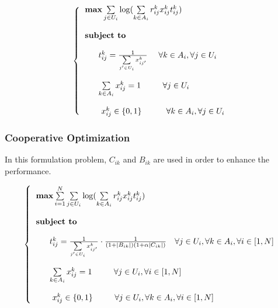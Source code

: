 \documentclass[journal,transmag]{IEEEtran}
\begin{document}
\begin{footnotesize}
\begin{equation}
\left\{
\begin{tabular}{l} 
$\textbf{max} \sum\limits_{j \in U_i} \log (\sum\limits_{k \in A_i} r_{ij}^k  x_{ij}^k  t_{ij}^k) $ \\         
\\
\textbf{subject to} \\

\\
~~~~~$t_{ij}^k = \frac{1}{\sum\limits_{j' \in U_i} x_{ij'}^k} ~~~~ \forall k \in A_i, \forall j \in U_i $  \\

\\
~~~~~$ \sum\limits_{k \in A_i} x_{ij}^k = 1 $ ~~~~~~ $\forall j \in U_i $  \\

\\
~~~~~ $x_{ij}^k \in \{0,1\} ~~~~~~~~~ \forall k \in A_i, \forall j \in U_i $ \\

\end{tabular}
\right.
\end{equation}
\end{footnotesize}


\subsubsection{Cooperative Optimization}
In this formulation problem, $C_{ik}$ and $B_{ik}$ are used in order to enhance the performance. 
\begin{footnotesize}
\begin{equation}
\left\{
\begin{tabular}{l} 
$\textbf{max}  \sum\limits_{i=1}^N \sum\limits_{j \in U_i}  \log ( \sum\limits_{k \in A_i} r_{ij}^k  x_{ij}^k t_{ij}^k) $ \\         
\\
\textbf{subject to} \\

\\
~~~~~$ t_{ij}^k = \frac{1}{\sum\limits_{j' \in U_i} x_{ij'}^k} \cdot \frac{1}{(1+|B_{ik}|)(1+\alpha |C_{ik}|)}     $ ~ $\forall j \in U_i, \forall k \in A_i, \forall i \in [1, N] $  \\ 

\\
~~~~~$ \sum\limits_{k \in A_i} x_{ij}^k = 1 $ ~~~~~~ $\forall j \in U_i, \forall i \in [1,N] $  \\

\\
~~~~~ $x_{ij}^k \in \{0,1\} ~~~~~~~~ \forall j \in U_i, \forall k \in A_i, \forall i \in [1,N] $ \\

\end{tabular}
\right.
\end{equation}
\end{footnotesize}
\end{document}
